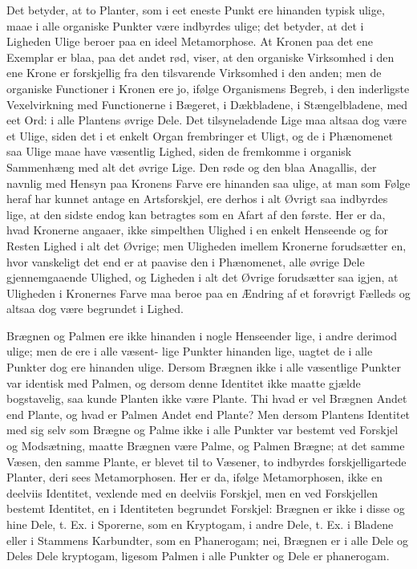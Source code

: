 \documentclass[12pt,a4paper]{book}
\begin{document}
Det betyder, at to Planter, som i eet eneste Punkt ere hinanden typisk
ulige, maae i alle organiske Punkter være indbyrdes ulige; det betyder,
at det i Ligheden Ulige beroer paa en ideel Metamorphose. At Kronen paa
det ene Exemplar er blaa, paa det andet rød, viser, at den organiske
Virksomhed i den ene Krone er forskjellig fra den tilsvarende
Virksomhed i den anden; men de organiske Functioner i Kronen ere jo,
ifølge Organismens Begreb, i den inderligste Vexelvirkning med
Functionerne i Bægeret, i Dækbladene, i Stængelbladene, med eet Ord: i
alle Plantens øvrige Dele. Det tilsyneladende Lige maa altsaa dog være
et Ulige, siden det i et enkelt Organ frembringer et Uligt, og de i
Phænomenet saa Ulige maae have væsentlig Lighed, siden de fremkomme i
organisk Sammenhæng med alt det øvrige Lige. Den røde og den blaa
Anagallis, der navnlig med Hensyn paa Kronens Farve ere hinanden saa
ulige, at man som Følge heraf har kunnet antage en Artsforskjel, ere
derhos i alt Øvrigt saa indbyrdes lige, at den sidste endog kan
betragtes som en Afart af den første. Her er da, hvad Kronerne angaaer,
ikke simpelthen Ulighed i en enkelt Henseende og for Resten Lighed i alt
det Øvrige; men Uligheden imellem Kronerne forudsætter en, hvor
vanskeligt det end er at paavise den i Phænomenet, alle øvrige Dele
gjennemgaaende Ulighed, og Ligheden i alt det Øvrige forudsætter saa
igjen, at Uligheden i Kronernes Farve maa beroe paa en Ændring af et
forøvrigt Fælleds og altsaa dog være begrundet i Lighed.

Brægnen og Palmen ere ikke hinanden i nogle Henseender lige, i andre
derimod ulige; men de ere i alle væsent-
lige Punkter hinanden lige, uagtet de i alle Punkter dog ere hinanden
ulige. Dersom Brægnen ikke i alle væsentlige Punkter var identisk med
Palmen, og dersom denne Identitet ikke maatte gjælde bogstavelig, saa
kunde Planten ikke være Plante. Thi hvad er vel Brægnen Andet end
Plante, og hvad er Palmen Andet end Plante? Men dersom Plantens
Identitet med sig selv som Brægne og Palme ikke i alle Punkter var
bestemt ved Forskjel og Modsætning, maatte Brægnen være Palme, og Palmen
Brægne; at det samme Væsen, den samme Plante, er blevet til to Væsener,
to indbyrdes forskjelligartede Planter, deri sees Metamorphosen. Her er
da, ifølge Metamorphosen, ikke en deelviis Identitet, vexlende med en
deelviis Forskjel, men en ved Forskjellen bestemt Identitet, en i
Identiteten begrundet Forskjel: Brægnen er ikke i disse og hine Dele,
t. Ex. i Sporerne, som en Kryptogam, i andre Dele, t. Ex. i Bladene
eller i Stammens Karbundter, som en Phanerogam; nei, Brægnen er i alle
Dele og Deles Dele kryptogam, ligesom Palmen i alle Punkter og Dele er
phanerogam.
\end{document}
